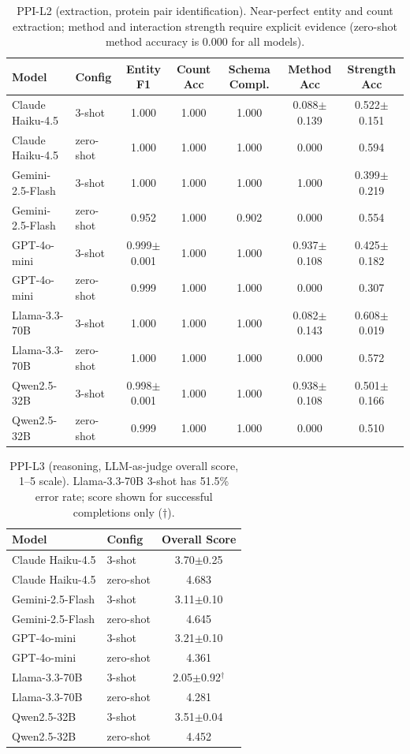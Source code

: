 \begin{table}[h]
\centering
\caption{PPI-L2 (extraction, protein pair identification). Near-perfect entity and count extraction; method and interaction strength require explicit evidence (zero-shot method accuracy is 0.000 for all models).}
\label{tab:ppi_l2_full}
\scriptsize
\begin{tabular}{@{}llccccc@{}}
\toprule
\textbf{Model} & \textbf{Config} & \textbf{Entity F1} & \textbf{Count Acc} & \textbf{Schema Compl.} & \textbf{Method Acc} & \textbf{Strength Acc} \\
\midrule
Claude Haiku-4.5 & 3-shot & 1.000 & 1.000 & 1.000 & 0.088$\pm$0.139 & 0.522$\pm$0.151 \\
Claude Haiku-4.5 & zero-shot & 1.000 & 1.000 & 1.000 & 0.000 & 0.594 \\
Gemini-2.5-Flash & 3-shot & 1.000 & 1.000 & 1.000 & 1.000 & 0.399$\pm$0.219 \\
Gemini-2.5-Flash & zero-shot & 0.952 & 1.000 & 0.902 & 0.000 & 0.554 \\
GPT-4o-mini & 3-shot & 0.999$\pm$0.001 & 1.000 & 1.000 & 0.937$\pm$0.108 & 0.425$\pm$0.182 \\
GPT-4o-mini & zero-shot & 0.999 & 1.000 & 1.000 & 0.000 & 0.307 \\
Llama-3.3-70B & 3-shot & 1.000 & 1.000 & 1.000 & 0.082$\pm$0.143 & 0.608$\pm$0.019 \\
Llama-3.3-70B & zero-shot & 1.000 & 1.000 & 1.000 & 0.000 & 0.572 \\
Qwen2.5-32B & 3-shot & 0.998$\pm$0.001 & 1.000 & 1.000 & 0.938$\pm$0.108 & 0.501$\pm$0.166 \\
Qwen2.5-32B & zero-shot & 0.999 & 1.000 & 1.000 & 0.000 & 0.510 \\
\bottomrule
\end{tabular}
\end{table}

\begin{table}[h]
\centering
\caption{PPI-L3 (reasoning, LLM-as-judge overall score, 1--5 scale). Llama-3.3-70B 3-shot has 51.5\% error rate; score shown for successful completions only ($\dagger$).}
\label{tab:ppi_l3_full}
\scriptsize
\begin{tabular}{@{}llc@{}}
\toprule
\textbf{Model} & \textbf{Config} & \textbf{Overall Score} \\
\midrule
Claude Haiku-4.5 & 3-shot & 3.70$\pm$0.25 \\
Claude Haiku-4.5 & zero-shot & 4.683 \\
Gemini-2.5-Flash & 3-shot & 3.11$\pm$0.10 \\
Gemini-2.5-Flash & zero-shot & 4.645 \\
GPT-4o-mini & 3-shot & 3.21$\pm$0.10 \\
GPT-4o-mini & zero-shot & 4.361 \\
Llama-3.3-70B & 3-shot & 2.05$\pm$0.92$^\dagger$ \\
Llama-3.3-70B & zero-shot & 4.281 \\
Qwen2.5-32B & 3-shot & 3.51$\pm$0.04 \\
Qwen2.5-32B & zero-shot & 4.452 \\
\bottomrule
\end{tabular}
\end{table}

